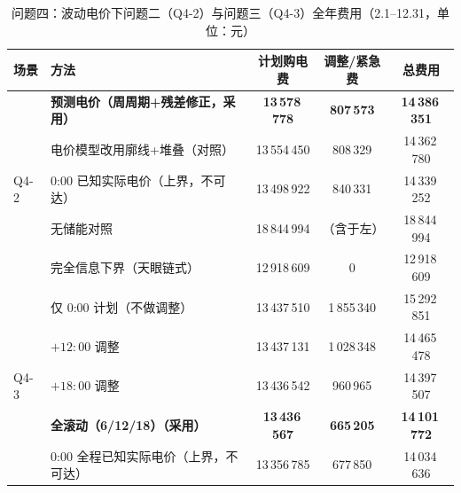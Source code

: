 \begin{table}[htbp]
\centering
\caption{问题四\nobreak：波动电价下问题二（Q4-2\nobreak）与问题三（Q4-3\nobreak）全年费用（2.1--12.31\nobreak，单位\nobreak：元\nobreak）}
\label{tab:q4cmp}
\begin{tabular}{@{}llccc@{}}
\toprule
场景 & 方法 & 计划购电费 & 调整/紧急费 & 总费用 \\
\midrule
\multirow{5}{*}{Q4-2}
& \textbf{预测电价（周周期+残差修正\nobreak，采用\nobreak）} & \textbf{13\,578\,778} & \textbf{807\,573} & \textbf{14\,386\,351} \\
& 电价模型改用廓线+堆叠（对照\nobreak） & 13\,554\,450 & 808\,329 & 14\,362\,780 \\
& 0:00 已知实际电价（上界\nobreak，不可达\nobreak） & 13\,498\,922 & 840\,331 & 14\,339\,252 \\
& 无储能对照 & 18\,844\,994 & （含于左\nobreak） & 18\,844\,994 \\
& 完全信息下界（天眼链式\nobreak） & 12\,918\,609 & 0 & 12\,918\,609 \\
\midrule
\multirow{5}{*}{Q4-3}
& 仅 0:00 计划（不做调整\nobreak） & 13\,437\,510 & 1\,855\,340 & 15\,292\,851 \\
& $+12{:}00$ 调整 & 13\,437\,131 & 1\,028\,348 & 14\,465\,478 \\
& $+18{:}00$ 调整 & 13\,436\,542 & 960\,965 & 14\,397\,507 \\
& \textbf{全滚动（6/12/18\nobreak）（采用\nobreak）} & \textbf{13\,436\,567} & \textbf{665\,205} & \textbf{14\,101\,772} \\
& 0:00 全程已知实际电价（上界\nobreak，不可达\nobreak） & 13\,356\,785 & 677\,850 & 14\,034\,636 \\
\bottomrule
\end{tabular}
\end{table}

